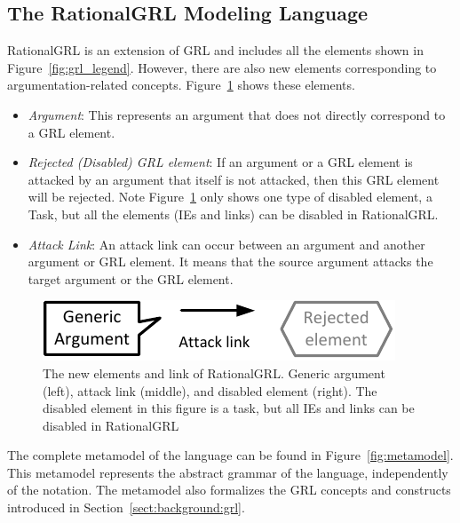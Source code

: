\subsection{The RationalGRL Modeling Language}
\label{sect:overview:lang}
\label{sect:metamodel}
RationalGRL is an extension of GRL and includes all the elements shown in Figure~\ref{fig:grl_legend}. However, there are also new elements corresponding to argumentation-related concepts. Figure~\ref{fig:rationalgrllegend} shows these elements. 
\begin{itemize}
\item \emph{Argument}: This represents an argument that does not directly correspond to a GRL element.  
\item \emph{Rejected (Disabled) GRL element}: If an argument or a GRL element is attacked by an argument that itself is not attacked, then this GRL element will be rejected. Note Figure~\ref{fig:rationalgrllegend} only shows one type of disabled element, a Task, but all the elements (IEs and links) can be disabled in RationalGRL.
\item \emph{Attack Link}: An attack link can occur between an argument and another argument or GRL element. It means that the source argument attacks the target argument or the GRL element.
\end{itemize} 

\begin{figure}[b]
\centering
\includegraphics{img/legend.pdf}
\caption{The new elements and link of RationalGRL. Generic argument (left), attack link (middle), and disabled element (right). The disabled element in this figure is a task, but all IEs and links can be disabled in RationalGRL}
\label{fig:rationalgrllegend}
\end{figure}


The complete metamodel of the language can be found in Figure~\ref{fig:metamodel}. This metamodel represents the abstract grammar of the language, independently of the notation. The metamodel also formalizes the GRL concepts and constructs introduced in Section~\ref{sect:background:grl}.

